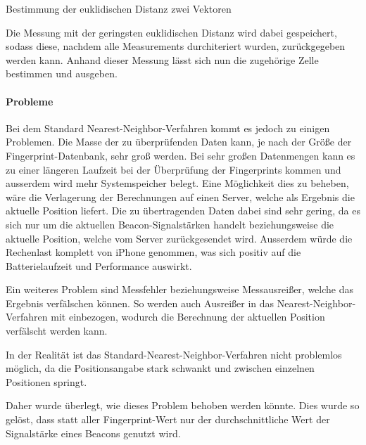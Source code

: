 \begin{listing}[htb!]
    \caption{Bestimmung der euklidischen Distanz zwei Vektoren}
	\label{lst:euclidean_distance_objc}
\end{listing}

Die Messung mit der geringsten euklidischen Distanz wird dabei gespeichert, sodass diese, nachdem alle Measurements durchiteriert wurden, zurückgegeben werden kann. Anhand dieser Messung lässt sich nun die zugehörige Zelle bestimmen und ausgeben.

\paragraph{Probleme}
\label{sec:implementation:fingerprinting:positioning:naiv:problems}
Bei dem Standard Nearest-Neighbor-Verfahren kommt es jedoch zu einigen Problemen. 
Die Masse der zu überprüfenden Daten kann, je nach der Größe der Fingerprint-Datenbank, sehr groß werden. Bei sehr großen Datenmengen kann es zu einer längeren Laufzeit bei der Überprüfung der Fingerprints kommen und ausserdem wird mehr Systemspeicher belegt. 
Eine Möglichkeit dies zu beheben, wäre die Verlagerung der Berechnungen auf einen Server, welche als Ergebnis die aktuelle Position liefert. Die zu übertragenden Daten dabei sind sehr gering, da es sich nur um die aktuellen Beacon-Signalstärken handelt beziehungsweise die aktuelle Position, welche vom Server zurückgesendet wird. 
Ausserdem würde die Rechenlast komplett von iPhone genommen, was sich positiv auf die Batterielaufzeit und Performance auswirkt.

Ein weiteres Problem sind Messfehler beziehungsweise Messausreißer, welche das Ergebnis verfälschen können. So werden auch Ausreißer in das Nearest-Neighbor-Verfahren mit einbezogen, wodurch die Berechnung der aktuellen Position verfälscht werden kann.

In der Realität ist das Standard-Nearest-Neighbor-Verfahren nicht problemlos möglich, da die Positionsangabe stark schwankt und zwischen einzelnen Positionen springt.

Daher wurde überlegt, wie dieses Problem behoben werden könnte. Dies wurde so gelöst, dass statt aller Fingerprint-Wert nur der durchschnittliche Wert der Signalstärke eines Beacons genutzt wird.


